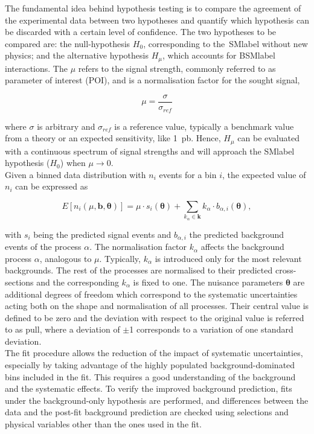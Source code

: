The fundamental idea behind hypothesis testing is to compare the agreement of the experimental data between two hypotheses and quantify which hypothesis can be discarded with a certain level of confidence. The two hypotheses to be compared are: the null-hypothesis $H_0$, corresponding to the~\acrshort{SMlabel} without new physics; and the alternative hypothesis $H_\mu$, which accounts for \acrshort{BSMlabel} interactions. The $\mu$ refers to the signal strength, commonly referred to as parameter of interest (POI), and is a normalisation factor for the sought signal,

\begin{equation}
    \mu = \frac{\sigma}{\sigma_{ref}}
\end{equation}

where $\sigma$ is arbitrary and $\sigma_{ref}$ is a reference value, typically a benchmark value from a theory or an expected sensitivity, like 1~pb. Hence, $H_\mu$ can be evaluated with a continuous spectrum of signal strengths and will approach the \acrshort{SMlabel} hypothesis ($H_0$) when $\mu\to0$.\\

Given a binned data distribution with $n_i$ events for a bin $i$, the expected value of $n_i$ can be expressed as

\begin{equation}
    E[n_i(\mu,\mathbf{b},\boldsymbol{\theta})] = \mu\cdot s_i(\boldsymbol{\theta}) + \sum_{k_{\alpha}\in\mathbf{k}}k_\alpha\cdot b_{\alpha,i}(\boldsymbol{\theta}),
\end{equation}

with $s_i$ being the predicted signal events and $b_{\alpha,i}$ the predicted background events of the process $\alpha$. The normalisation factor $k_\alpha$ affects the background process $\alpha$, analogous to $\mu$. Typically, $k_\alpha$ is introduced only for the most relevant backgrounds. The rest of the processes are normalised to their predicted cross-sections and the corresponding $k_\alpha$ is fixed to one. The nuisance parameters $\boldsymbol{\theta}$ are additional degrees of freedom which correspond to the systematic uncertainties acting both on the shape and normalisation of all processes. Their central value is defined to be zero and the deviation with respect to the original value is referred to as pull, where a deviation of $\pm$1 corresponds to a variation of one standard deviation.\\

The fit procedure allows the reduction of the impact of systematic uncertainties, especially by taking advantage of the highly populated background-dominated bins included in the fit. This requires a good understanding of the background and the systematic effects. To verify the improved background prediction, fits under the background-only hypothesis are performed, and differences between the data and the post-fit background prediction are checked using selections and physical variables other than the ones used in the fit.\\

